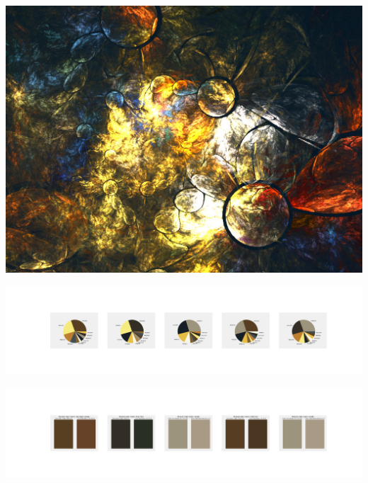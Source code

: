 \documentclass[11pt]{article}
\begin{document}
\begin{landscape}
    \begin{center}
    \includegraphics[width=\textwidth]{./nbimg/file (208).jpg}
    \end{center}

    \begin{center}
    \includegraphics[width=250mm]{./nbimg/pie-121.jpg}
    \end{center}

    \begin{center}
    \includegraphics[width=250mm]{./nbimg/peak-121.jpg}
    \end{center}
    


\end{landscape}
\end{document}
